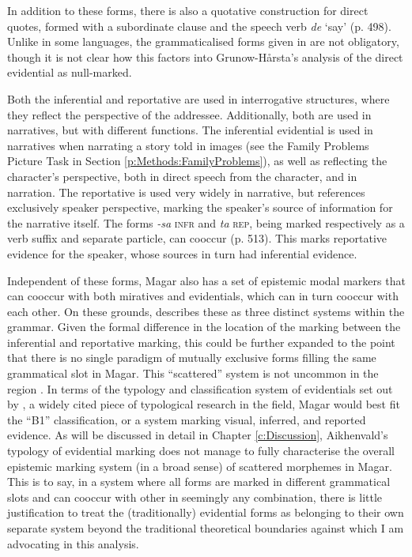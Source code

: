 In addition to these forms, there is also a quotative construction for direct quotes, formed with a subordinate clause and the speech verb \textit{de} `say' (p. 498). Unlike in some languages, the grammaticalised forms given in  are not obligatory, though it is not clear how this factors into Grunow-Hårsta's analysis of the direct evidential as null-marked.

Both the inferential and reportative are used in interrogative structures, where they reflect the perspective of the addressee. Additionally, both are used in narratives, but with different functions. The inferential evidential is used in narratives when narrating a story told in images (see the Family Problems Picture Task in Section \ref{p:Methods:FamilyProblems}), as well as reflecting the character's perspective, both in direct speech from the character, and in narration. The reportative is used very widely in narrative, but references exclusively speaker perspective, marking the speaker's source of information for the narrative itself. The forms \textit{-sa} \textsc{infr} and \textit{ta} \textsc{rep}, being marked respectively as a verb suffix and separate particle, can cooccur (p. 513). This marks reportative evidence for the speaker, whose sources in turn had inferential evidence.

Independent of these forms, Magar also has a set of epistemic modal markers that can cooccur with both miratives and evidentials, which can in turn cooccur with each other. On these grounds,  describes these as three distinct systems within the grammar. Given the formal difference in the location of the marking between the inferential and reportative marking, this could be further expanded to the point that there is no single paradigm of mutually exclusive forms filling the same grammatical slot in Magar. This ``scattered'' system is not uncommon in the region \cite[480-481]{GrunowHarsta2008}. In terms of the typology and classification system of evidentials set out by , a widely cited piece of typological research in the field, Magar would best fit the ``B1'' classification, or a system marking visual, inferred, and reported evidence. As will be discussed in detail in Chapter \ref{c:Discussion}, Aikhenvald's typology of evidential marking does not manage to fully characterise the overall epistemic marking system (in a broad sense) of scattered morphemes in Magar. This is to say, in a system where all forms are marked in different grammatical slots and can cooccur with other in seemingly any combination, there is little justification to treat the (traditionally) evidential forms as belonging to their own separate system beyond the traditional theoretical boundaries against which I am advocating in this analysis.


